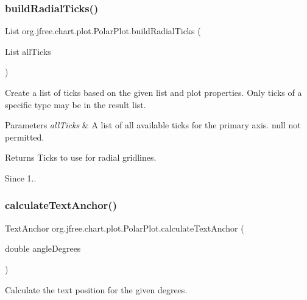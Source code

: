 \subsubsection{\texorpdfstring{build\+Radial\+Ticks()}{buildRadialTicks()}}
{\footnotesize\ttfamily List org.\+jfree.\+chart.\+plot.\+Polar\+Plot.\+build\+Radial\+Ticks (\begin{DoxyParamCaption}\item[{List}]{all\+Ticks }\end{DoxyParamCaption})\hspace{0.3cm}{\ttfamily [protected]}}

Create a list of ticks based on the given list and plot properties. Only ticks of a specific type may be in the result list.


\begin{DoxyParams}{Parameters}
{\em all\+Ticks} & A list of all available ticks for the primary axis. {\ttfamily null} not permitted. \\
\hline
\end{DoxyParams}
\begin{DoxyReturn}{Returns}
Ticks to use for radial gridlines. 
\end{DoxyReturn}
\begin{DoxySince}{Since}
1.. 
\end{DoxySince}
\mbox{\label{classorg_1_1jfree_1_1chart_1_1plot_1_1_polar_plot_a25b02ca01086c46485c32e8bc2f857a0}} 
\subsubsection{\texorpdfstring{calculate\+Text\+Anchor()}{calculateTextAnchor()}}
{\footnotesize\ttfamily Text\+Anchor org.\+jfree.\+chart.\+plot.\+Polar\+Plot.\+calculate\+Text\+Anchor (\begin{DoxyParamCaption}\item[{double}]{angle\+Degrees }\end{DoxyParamCaption})\hspace{0.3cm}{\ttfamily [protected]}}

Calculate the text position for the given degrees.


